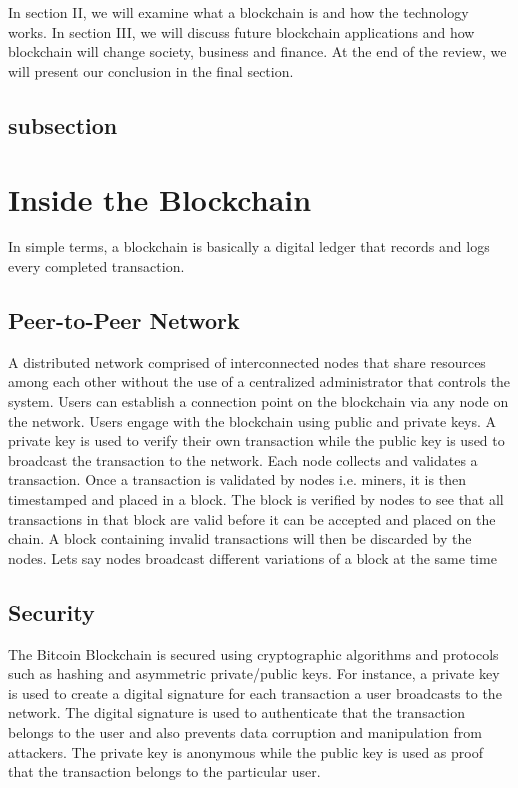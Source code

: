 \documentclass[report]{IEEEtran}
\begin{document}
\\\\ In section II, we will examine what a blockchain is and how the technology works. In section III, we will discuss future blockchain applications and how blockchain will change society, business and finance. At the end of the review, we will present our conclusion in the final section.

\subsection{subsection}

\section{Inside the Blockchain}
In simple terms, a blockchain is basically a digital ledger that records and logs every completed transaction. 
\subsection{Peer-to-Peer Network}
A distributed network comprised of interconnected nodes that share resources among each other without the use of a centralized administrator that controls the system. Users can establish a connection point on the blockchain via any node on the network. Users engage with the blockchain using public and private keys. A private key is used to verify their own transaction while the public key is used to broadcast the transaction to the network. Each node collects and validates a transaction. Once a transaction is validated by nodes i.e. miners, it is then timestamped and placed in a block. The block is verified by nodes to see that all transactions in that block are valid before it can be accepted and placed on the chain. A block containing invalid transactions will then be discarded by the nodes. Lets say nodes broadcast different variations of a block at the same time
\subsection{Security}
The Bitcoin Blockchain is secured using cryptographic algorithms and protocols such as hashing and asymmetric private/public keys. For instance, a private key is used to create a digital signature for each transaction a user broadcasts to the network. The digital signature is used to authenticate that the transaction belongs to the user and also prevents data corruption and manipulation from attackers. The private key is anonymous while the public key is used as proof that the transaction belongs to the particular user. 
\end{document}
